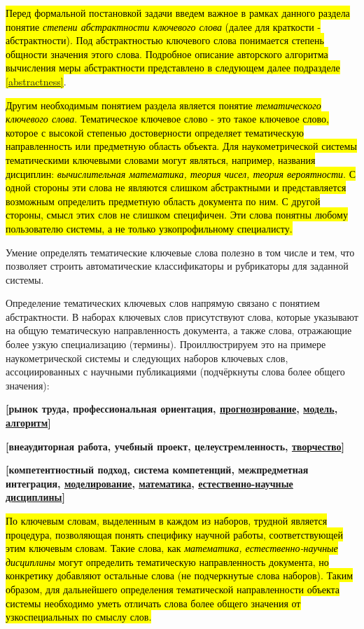 \hl{Перед формальной постановкой задачи введем важное в рамках данного раздела понятие \emph{степени абстрактности ключевого слова} (далее для краткости - абстрактности). Под абстрактностью ключевого слова понимается степень общности значения этого слова. Подробное описание авторского алгоритма вычисления меры абстрактности представлено в следующем далее подразделе \ref{abstractness}}.

\hl{Другим необходимым понятием раздела является понятие \emph{тематического ключевого слова}. Тематическое ключевое слово - это такое ключевое слово, которое с высокой степенью достоверности определяет тематическую направленность или предметную область объекта.  Для наукометрической системы тематическими ключевыми словами могут являться, например, названия дисциплин: \emph{вычислительная математика, теория чисел, теория вероятности}. С одной стороны эти слова не являются слишком абстрактными и представляется возможным определить предметную область документа по ним. С другой стороны, смысл этих слов не слишком специфичен. Эти слова понятны любому пользователю системы, а не только узкопрофильному специалисту.}

Умение определять тематические ключевые слова полезно в том числе и тем, что позволяет строить автоматические классификаторы и рубрикаторы для заданной системы.

Определение тематических ключевых слов напрямую связано с понятием абстрактности. В наборах ключевых слов присутствуют слова, которые указывают на общую тематическую направленность документа, а также слова, отражающие более узкую специализацию (термины). Проиллюстрируем это на примере наукометрической системы и следующих наборов ключевых слов, ассоциированных с научными публикациями (подчёркнуты слова более общего значения):

    \textbf{[рынок труда, профессиональная ориентация, \underline{прогнозирование}, \underline{модель}, \underline{алгоритм}]}\

    \textbf{[внеаудиторная работа, учебный проект, целеустремленность, \underline{творчество}]}\

    \textbf{[компетентностный подход, система компетенций, межпредметная интеграция, \underline{моделирование}, \underline{математика}, \underline{естественно-научные дисциплины}]}\

\hl{По ключевым словам, выделенным в каждом из наборов, трудной является процедура, позволяющая понять специфику научной работы, соответствующей этим ключевым словам. Такие слова, как \emph{математика, естественно-научные дисциплины} могут определить тематическую направленность документа, но конкретику добавляют остальные слова (не подчеркнутые слова наборов). Таким образом, для дальнейшего определения тематической направленности объекта системы необходимо уметь отличать слова более общего значения от узкоспециальных по смыслу слов. }

